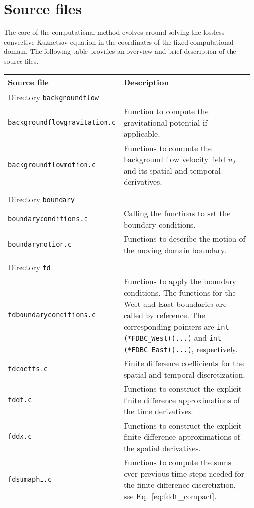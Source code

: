 \section{Source files}
\label{sec:Source files}

The core of the computational method evolves around solving the lossless convective Kuznetsov equation in the coordinates of the fixed computational domain. The following table provides an overview and brief description of the source files.

\noindent
\begin{longtable}{p{} p{}}
\textbf{Source file} & \textbf{Description}
\vspace{1mm} \\
\hline Directory {\tt backgroundflow} &\\ \hline
{\tt backgroundflowgravitation.c} & Function to compute the gravitational potential if applicable. \\
{\tt backgroundflowmotion.c} & Functions to compute the background flow velocity field $u_0$ and its spatial and temporal derivatives. \\
\\
\hline Directory {\tt boundary} &\\ \hline
{\tt boundaryconditions.c} & Calling the functions to set the boundary conditions. \\
{\tt boundarymotion.c} & Functions to describe the motion of the moving domain boundary. \\
\\
\hline Directory {\tt fd} &\\ \hline
{\tt fdboundaryconditions.c} & Functions to apply the boundary conditions. The functions for the West and East boundaries are called by reference. The corresponding pointers are {\tt int (*FDBC\_West)(...)} and {\tt int (*FDBC\_East)(...)}, respectively.  \\
{\tt fdcoeffs.c} & Finite difference coefficients for the spatial and temporal discretization. \\
{\tt fddt.c} & Functions to construct the explicit finite difference approximations of the time derivatives. \\
{\tt fddx.c} & Functions to construct the explicit finite difference approximations of the spatial derivatives.  \\
{\tt fdsumaphi.c} & Functions to compute the sums over previous time-steps needed for the finite difference discretiztion, see Eq.~\eqref{eq:fddt_compact}. \\

\end{longtable}
